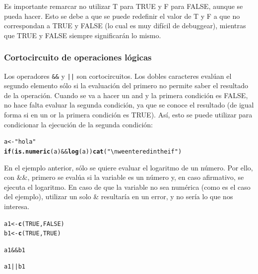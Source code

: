 \documentclass{config/apuntes}\usepackage[]{graphicx}\usepackage[]{xcolor}
\makeatletter
\newcommand{\hlnum}[1]{\textcolor[rgb]{0.686,0.059,0.569}{#1}}%
\newcommand{\hlsng}[1]{\textcolor[rgb]{0.192,0.494,0.8}{#1}}%
\newcommand{\hlopt}[1]{\textcolor[rgb]{0,0,0}{#1}}%
\newcommand{\hldef}[1]{\textcolor[rgb]{0.345,0.345,0.345}{#1}}%
\newcommand{\hlkwa}[1]{\textcolor[rgb]{0.161,0.373,0.58}{\textbf{#1}}}%
\newcommand{\hlkwb}[1]{\textcolor[rgb]{0.69,0.353,0.396}{#1}}%
\newcommand{\hlkwd}[1]{\textcolor[rgb]{0.737,0.353,0.396}{\textbf{#1}}}%
\newenvironment{kframe}{%
 \def\at@end@of@kframe{}%
 \ifinner\ifhmode%
  \def\at@end@of@kframe{\end{minipage}}%
  \begin{minipage}{\columnwidth}%
 \fi\fi%
 \def\FrameCommand##1{\hskip\@totalleftmargin \hskip-\fboxsep
 \colorbox{shadecolor}{##1}\hskip-\fboxsep
     \hskip-\linewidth \hskip-\@totalleftmargin \hskip\columnwidth}%
 \MakeFramed {\advance\hsize-\width
   \@totalleftmargin\z@ \linewidth\hsize
   \@setminipage}}%
 {\par\unskip\endMakeFramed%
 \at@end@of@kframe}
\newenvironment{knitrout}{}{} %
\newcommand{\code}[1]{\texttt{#1}}
\makeatother
\begin{document}
Es importante remarcar no utilizar T para TRUE y F para FALSE, aunque se pueda hacer. Esto se debe a que se puede redefinir el valor de T y F a que no correspondan a TRUE y FALSE (lo cual es muy difícil de debuggear), mientras que TRUE y FALSE siempre significarán lo mismo. 

\subsubsection{Cortocircuito de operaciones lógicas}
Los operadores \code{\&\&} y \code{||} son cortocircuitos. Los dobles caracteres evalúan el segundo elemento sólo si la evaluación del primero no permite saber el resultado de la operación. Cuando se va a hacer un and y la primera condición es FALSE, no hace falta evaluar la segunda condición, ya que se conoce el resultado (de igual forma si en un or la primera condición es TRUE). Así, esto se puede utilizar para condicionar la ejecución de la segunda condición:

\begin{knitrout}
\color{fgcolor}\begin{kframe}
\begin{alltt}
\hldef{a} \hlkwb{<-} \hlsng{"hola"}
\hlkwa{if} \hldef{(}\hlkwd{is.numeric}\hldef{(a)} \hlopt{&&} \hlkwd{log}\hldef{(a))} \hlkwd{cat}\hldef{(}\hlsng{"\textbackslash{}n we entered in the if"}\hldef{)}
\end{alltt}
\end{kframe}
\end{knitrout}

En el ejemplo anterior, sólo se quiere evaluar el logaritmo de un número. Por ello, con \&\&, primero se evalúa si la variable es un número y, en caso afirmativo, se ejecuta el logaritmo. En caso de que la variable no sea numérica (como es el caso del ejemplo), utilizar un solo \& resultaría en un error, y no sería lo que nos interesa. 

\begin{knitrout}
\color{fgcolor}\begin{kframe}
\begin{alltt}
\hldef{a1} \hlkwb{<-} \hlkwd{c}\hldef{(}\hlnum{TRUE}\hldef{,} \hlnum{FALSE}\hldef{)}
\hldef{b1} \hlkwb{<-} \hlkwd{c}\hldef{(}\hlnum{TRUE}\hldef{,} \hlnum{TRUE}\hldef{)}

\hldef{a1} \hlopt{&&} \hldef{b1}
\end{alltt}


{\ttfamily\noindent\bfseries\color{errorcolor}{\#\# Error in a1 \&\& b1: 'length = 2' in coercion to 'logical(1)'}}\begin{alltt}
\hldef{a1} \hlopt{||} \hldef{b1}
\end{alltt}


{\ttfamily\noindent\bfseries\color{errorcolor}{\#\# Error in a1 || b1: 'length = 2' in coercion to 'logical(1)'}}\end{kframe}
\end{knitrout}
\end{document}
